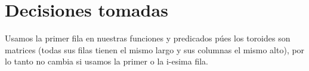 \documentclass[a4paper]{article}
\begin{document}
\section{Decisiones tomadas}

Usamos la primer fila en nuestras funciones y predicados púes los toroides son matrices (todas sus filas tienen el mismo largo y sus columnas el mismo alto), por lo tanto no cambia si usamos la primer o la i-esima fila.
\end{document}
